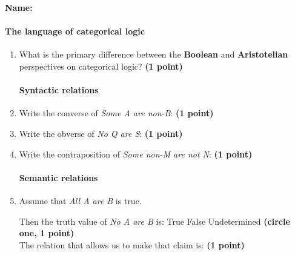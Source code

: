\documentclass[10pt]{article}
\begin{document}
\small

\textbf{Name:}\underline{\hspace{2in}}

\paragraph{The language of categorical logic}

\begin{enumerate}
 \item What is the primary difference between the \textbf{Boolean} and \textbf{Aristotelian} perspectives on categorical logic? \textbf{(1 point)}
 

\vspace{1.5cm}

\paragraph{Syntactic relations}

  \item Write the converse of \textit{Some A are non-B}: \underline{\hspace{3in}} \textbf{(1 point)}
  
  \item Write the obverse of \textit{No Q are S}: \underline{\hspace{3in}} \textbf{(1 point)}
  
  \item Write the contraposition of \textit{Some non-M are not N}: \underline{\hspace{3in}} \textbf{(1 point)}

\paragraph{Semantic relations}

  \item Assume that \textit{All A are B} is true. 
  
  Then the truth value of \textit{No A are B} is: \hspace{1cm} True \hspace{1cm} False \hspace{1cm} Undetermined \hspace{1cm} \textbf{(circle one, 1 point)} \\
  
  The relation that allows us to make that claim is: \underline{\hspace{3in}} \textbf{(1 point)}
  

\end{enumerate}
\end{document}
